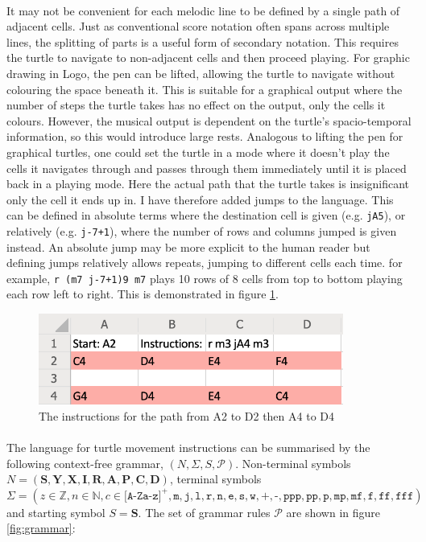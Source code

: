 \paragraph{} It may not be convenient for each melodic line to be defined by a single path of adjacent cells. Just as conventional score notation often spans across multiple lines, the splitting of parts is a useful form of secondary notation. This requires the turtle to navigate to non-adjacent cells and then proceed playing. For graphic drawing in Logo, the pen can be lifted, allowing the turtle to navigate without colouring the space beneath it. This is suitable for a graphical output where the number of steps the turtle takes has no effect on the output, only the cells it colours. However, the musical output is dependent on the turtle's spacio-temporal information, so this would introduce large rests. Analogous to lifting the pen for graphical turtles, one could set the turtle in a mode where it doesn't play the cells it navigates through and passes through them immediately until it is placed back in a playing mode. Here the actual path that the turtle takes is insignificant only the cell it ends up in. I have therefore added jumps to the language. This can be defined in absolute terms where the destination cell is given (e.g. \texttt{jA5}), or relatively (e.g. \texttt{j-7+1}), where the number of rows and columns jumped is given instead. An absolute jump may be more explicit to the human reader but defining jumps relatively allows repeats, jumping to different cells each time. for example, \texttt{r (m7 j-7+1)9 m7} plays 10 rows of 8 cells from top to bottom playing each row left to right. This is demonstrated in figure \ref{prep:language2}.

\begin{figure}[ht]
  \centerline{\includegraphics[width=100mm]{figs/diss2.png}}
\caption{The instructions for the path from A2 to D2 then A4 to D4}
\label{prep:language2}
\end{figure}
\vspace{-20pt}

\paragraph{} The language for turtle movement instructions can be summarised by the following context-free grammar, $(N,\Sigma,S,\mathcal{P})$. Non-terminal symbols $N=(\mathbf{S}, \mathbf{Y}, \mathbf{X}, \mathbf{I}, \mathbf{R}, \mathbf{A}, \mathbf{P}, \mathbf{C}, \mathbf{D})$, terminal symbols $\Sigma=(z{\in}\mathbb{Z}, n{\in}\mathbb{N}, c{\in}\texttt{[A-Za-z]}^{+}, \texttt{m}, \texttt{j}, \texttt{l}, \texttt{r}, \texttt{n}, \texttt{e}, \texttt{s}, \texttt{w}, \texttt{+}, \texttt{-}, \texttt{ppp}, \texttt{pp}, \texttt{p}, \texttt{mp}, \texttt{mf}, \texttt{f}, \texttt{ff}, \texttt{fff})$ and starting symbol $S = \mathbf{S}$. The set of grammar rules $\mathcal{P}$ are shown in figure \ref{fig:grammar}:

